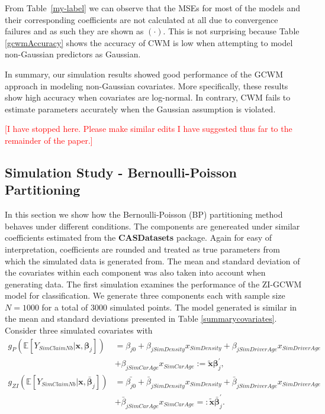 \documentclass[12pt,letterpaper]{article}
\numberwithin{equation}{section}
\numberwithin{equation}{section}
\numberwithin{equation}{section}
\newcommand{\xTilda}{\tilde{\bm{x}}}
\begin{document}
From Table~\ref{my-label} we can observe that the MSEs for most of the models and their corresponding coefficients are not calculated at all due to convergence failures and as such they are shown as $(\cdot)$. This is not surprising because Table \ref{gcwmAccuracy} shows the accuracy of CWM is low when attempting to model non-Gaussian predictors as Gaussian. 

In summary, our simulation results showed good performance of the GCWM approach in modeling non-Gaussian covariates. More specifically, these results show high accuracy when covariates are log-normal. In contrary, CWM fails to estimate parameters accurately when the Gaussian assumption is violated.

\clearpage\textcolor{red}{[I have stopped here. Please make similar edits I have suggested thus far to the remainder of the paper.]}


\subsection{Simulation Study - Bernoulli-Poisson Partitioning}

In this section we show how the Bernoulli-Poisson (BP) partitioning method behaves under different conditions. The components are genereated under similar coefficients estimated from the \textbf{CASDatasets} package. Again for easy of interpretation, coefficients are rounded and treated as true parameters from which the simulated data is generated from. The mean and standard deviation of the covariates within each component was also taken into account when generating data. The first simulation examines the performance of the ZI-GCWM model for classification. We generate three components each with sample size $N=1000$ for a total of $3000$ simulated points.
The model generated is similar in the mean and standard deviations presented in Table \ref{summarycovariates}. Consider three simulated covariates with 
\begin{align}
g_P(\mathbb{E}\left[Y_{SimClaimNb}|\bm{x}, \bm{\beta}_j \right]) & = 
  \beta_{j0} +  \beta_{jSimDensity} x_{SimDensity} +  \beta_{jSimDriverAge} x_{SimDriverAge} \nonumber  \\ & + 
   \beta_{jSimCarAge} x_{SimCarAge} := \bm{\xTilda} \bm{\beta}_j^{'},  \label{poissonRegSim} \\
g_{ZI}(\mathbb{E}\left[Y_{SimClaimNb}|\bm{x} , \bar{\bm{\beta}}_j  \right]) & = 
  \bar{\beta_{j0}} +  \bar{\beta}_{jSimDensity} x_{SimDensity} +  \bar{\beta}_{jSimDriverAge} x_{SimDriverAge} \nonumber \\ & + 
  \bar{ \beta}_{jSimCarAge} x_{SimCarAge} =: \bm{\xTilda} \bar{\bm{\beta}}_j^{'}.  \label{zeroRegSim}
\end{align}
\end{document}
